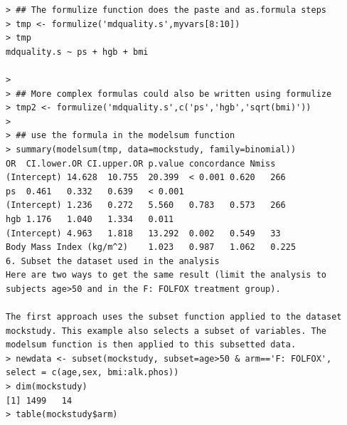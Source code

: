\documentclass[
]{book}
\begin{document}
\begin{verbatim}
> ## The formulize function does the paste and as.formula steps
> tmp <- formulize('mdquality.s',myvars[8:10])
> tmp
mdquality.s ~ ps + hgb + bmi

> 
> ## More complex formulas could also be written using formulize
> tmp2 <- formulize('mdquality.s',c('ps','hgb','sqrt(bmi)'))
> 
> ## use the formula in the modelsum function
> summary(modelsum(tmp, data=mockstudy, family=binomial))
OR  CI.lower.OR CI.upper.OR p.value concordance Nmiss
(Intercept) 14.628  10.755  20.399  < 0.001 0.620   266
ps  0.461   0.332   0.639   < 0.001     
(Intercept) 1.236   0.272   5.560   0.783   0.573   266
hgb 1.176   1.040   1.334   0.011       
(Intercept) 4.963   1.818   13.292  0.002   0.549   33
Body Mass Index (kg/m^2)    1.023   0.987   1.062   0.225       
6. Subset the dataset used in the analysis
Here are two ways to get the same result (limit the analysis to subjects age>50 and in the F: FOLFOX treatment group).

The first approach uses the subset function applied to the dataset mockstudy. This example also selects a subset of variables. The modelsum function is then applied to this subsetted data.
> newdata <- subset(mockstudy, subset=age>50 & arm=='F: FOLFOX', select = c(age,sex, bmi:alk.phos))
> dim(mockstudy)
[1] 1499   14
> table(mockstudy$arm)


\end{verbatim}
\end{document}
